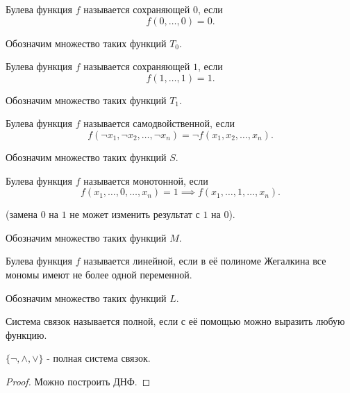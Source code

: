 \begin{definition} \thmslashn 

    Булева функция $f$ называется сохраняющей $0$, если
    \[ f(0, \ldots, 0) = 0 .\]

    Обозначим множество таких функций $T_0$.
\end{definition}
\begin{definition} \thmslashn 

    Булева функция $f$ называется сохраняющей $1$, если
    \[ f(1, \ldots, 1) = 1 .\]

    Обозначим множество таких функций $T_1$.
\end{definition}
\begin{definition} \thmslashn 

    Булева функция $f$ называется самодвойственной, если
    \[ f(\neg x_1, \neg x_2, \ldots, \neg x_n) = \neg f(x_1, x_2, \ldots, x_{n}) .\]

    Обозначим множество таких функций $S$.
\end{definition}
\begin{definition} \thmslashn 

    Булева функция $f$ называется монотонной, если
    \[ f(x_1, \ldots, 0, \ldots, x_{n}) = 1 \implies f(x_1, \ldots, 1, \ldots, x_{n}) .\]

    (замена $0$ на $1$ не может изменить результат с $1$ на $0$).

    Обозначим множество таких функций $M$.
\end{definition}
\begin{definition} \thmslashn 

    Булева функция $f$ называется линейной, если в её полиноме Жегалкина все мономы имеют не более одной переменной.

    Обозначим множество таких функций $L$.
\end{definition}
\begin{definition} \thmslashn 

    Система связок называется полной, если с её помощью можно выразить любую функцию.
\end{definition}
\begin{lemma} \thmslashn

    $\{\neg, \land, \lor\} $ - полная система связок.
    \begin{proof} \thmslashn
    
        Можно построить ДНФ.
    \end{proof}
\end{lemma}
